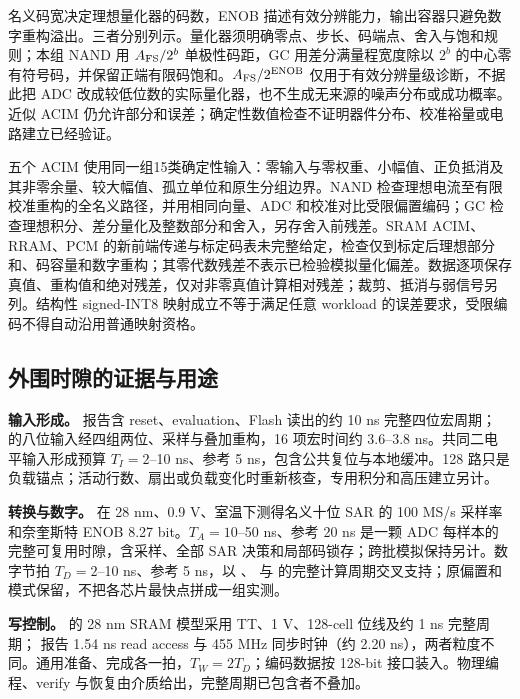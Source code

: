 名义码宽决定理想量化器的码数，ENOB 描述有效分辨能力，输出容器只避免数字重构溢出。三者分别列示。量化器须明确零点、步长、码端点、舍入与饱和规则；本组 NAND 用 $A_{\rm FS}/2^b$ 单极性码距，GC 用差分满量程宽度除以 $2^b$ 的中心零有符号码，并保留正端有限码饱和。$A_{\rm FS}/2^{\rm ENOB}$ 仅用于有效分辨量级诊断，不据此把 ADC 改成较低位数的实际量化器，也不生成无来源的噪声分布或成功概率。近似 ACIM 仍允许部分和误差；确定性数值检查不证明器件分布、校准裕量或电路建立已经验证。

五个 ACIM 使用同一组15类确定性输入：零输入与零权重、小幅值、正负抵消及其非零余量、较大幅值、孤立单位和原生分组边界。NAND 检查理想电流至有限校准重构的全名义路径，并用相同向量、ADC 和校准对比受限偏置编码；GC 检查理想积分、差分量化及整数部分和舍入，另存舍入前残差。SRAM ACIM、RRAM、PCM 的新前端传递与标定码表未完整给定，检查仅到标定后理想部分和、码容量和数字重构；其零代数残差不表示已检验模拟量化偏差。数据逐项保存真值、重构值和绝对残差，仅对非零真值计算相对残差；裁剪、抵消与弱信号另列。结构性 signed-INT8 映射成立不等于满足任意 workload 的误差要求，受限编码不得自动沿用普通映射资格。

\subsection{外围时隙的证据与用途}

\textbf{输入形成。} 报告含 reset、evaluation、Flash 读出的约 10 ns 完整四位宏周期； 的八位输入经四组两位、采样与叠加重构，16 项宏时间约 3.6--3.8 ns。共同二电平输入形成预算 $T_I=2$--10 ns、参考 5 ns，包含公共复位与本地缓冲。128 路只是负载锚点；活动行数、扇出或负载变化时重新核查，专用积分和高压建立另计。\cite{SACIM-03,SACIM-05}

\textbf{转换与数字。} 在 28 nm、0.9 V、室温下测得名义十位 SAR 的 100 MS/s 采样率和奈奎斯特 ENOB 8.27 bit。$T_A=10$--50 ns、参考 20 ns 是一颗 ADC 每样本的完整可复用时隙，含采样、全部 SAR 决策和局部码锁存；跨批模拟保持另计。数字节拍 $T_D=2$--10 ns、参考 5 ns，以 、 与  的完整计算周期交叉支持；原偏置和模式保留，不把各芯片最快点拼成一组实测。\cite{CMOS-02,SDCIM-01,SDCIM-03,SDCIM-05}

\textbf{写控制。} 的 28 nm SRAM 模型采用 TT、1 V、128-cell 位线及约 1 ns 完整周期； 报告 1.54 ns read access 与 455 MHz 同步时钟（约 2.20 ns），两者粒度不同。通用准备、完成各一拍，$T_W=2T_D$；编码数据按 128-bit 接口装入。物理编程、verify 与恢复由介质给出，完整周期已包含者不叠加。\cite{CMOS-03,CMOS-07}

